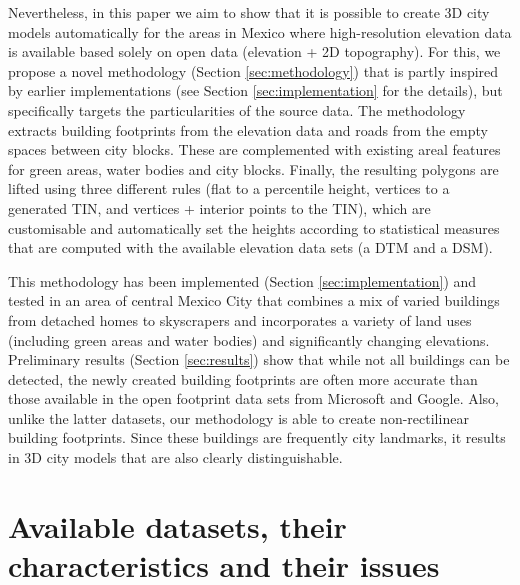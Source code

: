 \documentclass{isprs} %
\begin{document}
Nevertheless, in this paper we aim to show that it is possible to create 3D city models automatically for the areas in Mexico where high-resolution elevation data is available based solely on open data (elevation + 2D topography).
For this, we propose a novel methodology (Section \ref{sec:methodology}) that is partly inspired by earlier implementations (see Section \ref{sec:implementation} for the details), but specifically targets the particularities of the source data.
The methodology extracts building footprints from the elevation data and roads from the empty spaces between city blocks.
These are complemented with existing areal features for green areas, water bodies and city blocks.
Finally, the resulting polygons are lifted using three different rules (flat to a percentile height, vertices to a generated TIN, and vertices + interior points to the TIN), which are customisable and automatically set the heights according to statistical measures that are computed with the available elevation data sets (a DTM and a DSM).

This methodology has been implemented (Section \ref{sec:implementation}) and tested in an area of central Mexico City that combines a mix of varied buildings from detached homes to skyscrapers and incorporates a variety of land uses (including green areas and water bodies) and significantly changing elevations.
Preliminary results (Section \ref{sec:results}) show that while not all buildings can be detected, the newly created building footprints are often more accurate than those available in the open footprint data sets from Microsoft and Google.
Also, unlike the latter datasets, our methodology is able to create non-rectilinear building footprints.
Since these buildings are frequently city landmarks, it results in 3D city models that are also clearly distinguishable.


\section{Available datasets, their characteristics and their issues}
\label{sec:data}
\end{document}
